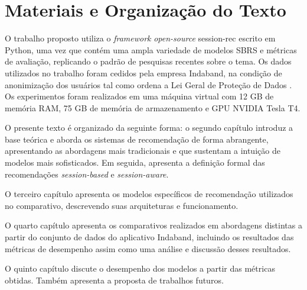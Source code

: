 \section{Materiais e Organização do Texto}

O trabalho proposto utiliza o \textit{framework} \textit{open-source}
session-rec \cite{sessionrec} escrito em Python, uma vez que contém uma ampla
variedade de modelos SBRS e métricas de avaliação, replicando o padrão de
pesquisas recentes sobre o tema. Os dados utilizados no trabalho foram cedidos
pela empresa Indaband, na condição de anonimização dos usuários tal como ordena
a Lei Geral de Proteção de Dados \cite{lgpd}. Os experimentos foram realizados
em uma máquina virtual com 12 GB de memória RAM, 75 GB de memória de
armazenamento e GPU NVIDIA Tesla T4.

O presente texto é organizado da seguinte forma: o segundo capítulo introduz a
base teórica e aborda os sistemas de recomendação de forma abrangente,
apresentando as abordagens mais tradicionais e que sustentam a intuição de
modelos mais sofisticados. Em seguida, apresenta a definição formal das
recomendações \textit{session-based} e \textit{session-aware}.

O terceiro capítulo apresenta os modelos específicos de recomendação
utilizados no comparativo, descrevendo suas arquiteturas e funcionamento.

O quarto capítulo apresenta os comparativos realizados em abordagens distintas a
partir do conjunto de dados do aplicativo Indaband, incluindo os resultados das métricas
de desempenho assim como uma análise e discussão desses resultados.

O quinto capítulo discute o desempenho dos modelos a partir das métricas
obtidas. Também apresenta a proposta de trabalhos futuros.
